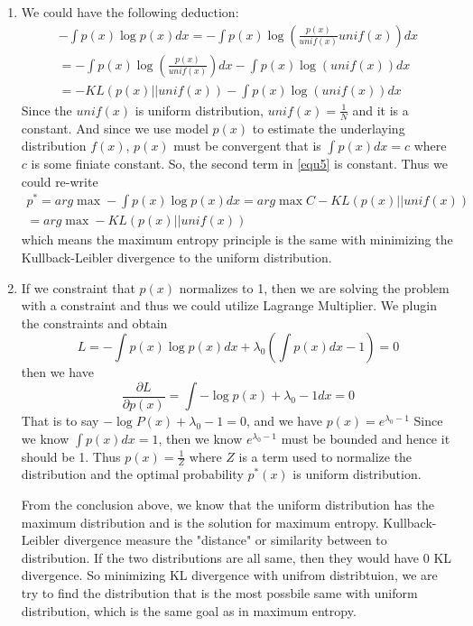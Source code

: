 \documentclass[paper=a4, fontsize=12pt]{scrartcl} %
\numberwithin{equation}{section} %
\numberwithin{figure}{section} %
\numberwithin{table}{section} %
\begin{document}
\begin{enumerate}
\item We could have the following deduction:
\begin{equation}
\label{equ5}
\begin{aligned}
-\int p(x)\log p(x)dx = -\int p(x)\log (\frac{p(x)}{unif(x)} unif(x))dx \\
= -\int p(x)\log (\frac{p(x)}{unif(x)})dx -\int p(x)\log (unif(x))dx \\
= -KL(p(x)||unif(x)) -\int p(x)\log (unif(x))dx
\end{aligned}
\end{equation}
Since the $unif(x)$ is uniform distribution, $unif(x) = \frac{1}{N}$ and it is a constant. And since we use model $p(x)$ to estimate the underlaying distribution $f(x)$, $p(x)$ must be convergent that is $\int p(x)dx = c$ where $c$ is some finiate constant. So, the second term in \ref{equ5} is constant. Thus we could re-write 
\begin{equation}
\label{equ6}
\begin{aligned}
p^{*} = arg\max -\int p(x)\log p(x)dx = arg\max C -KL(p(x)||unif(x)) \\
= arg\max -KL(p(x)||unif(x))
\end{aligned}
\end{equation}	
which means the maximum entropy principle is the same with minimizing the Kullback-Leibler divergence to the uniform distribution.

\item If we constraint that $p(x)$ normalizes to 1, then we are solving the problem with a constraint and thus we could utilize Lagrange Multiplier. We plugin the constraints and obtain
\begin{equation}
\label{equ7}
L = -\int p(x)\log p(x)dx + \lambda_{0}(\int p(x)dx - 1) = 0
\end{equation}
then we have
\begin{equation}
\label{equ8}
\frac{\partial L}{\partial p(x)} = \int -\log p(x) + \lambda_{0} - 1 dx = 0
\end{equation}
That is to say $-\log P(x) + \lambda_{0} - 1 = 0$, and we have $p(x) = e^{\lambda_{0} - 1}$ Since we know $\int p(x)dx = 1$, then we know $e^{\lambda_{0} - 1}$ must be bounded and hence it should be 1. Thus $p(x) = \frac{1}{Z}$ where $Z$ is a term used to normalize the distribution and the optimal probability $p^{*}(x)$ is uniform distribution.

From the conclusion above, we know that the uniform distribution has the maximum distribution and is the solution for maximum entropy. Kullback-Leibler divergence measure the "distance" or similarity between to distribution. If the two distributions are all same, then they would have 0 KL divergence. So minimizing KL divergence with unifrom distribtuion, we are try to find the distribution that is the most possbile same with uniform distribution, which is the same goal as in maximum entropy.
\end{enumerate}
\end{document}

